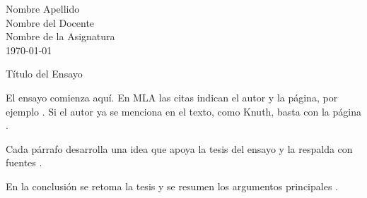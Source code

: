 \documentclass[12pt,a4paper]{article}
\begin{document}
\noindent Nombre Apellido\\
Nombre del Docente\\
Nombre de la Asignatura\\
\today

\begin{center}
  Título del Ensayo
\end{center}

El ensayo comienza aquí. En MLA las citas indican el autor y la página, por ejemplo
\autocite[12]{lamport1994}. Si el autor ya se menciona en el texto, como Knuth, basta
con la página \autocite[45]{knuth1984}.

Cada párrafo desarrolla una idea que apoya la tesis del ensayo y la respalda con
fuentes \autocite[3]{mla2021}.

En la conclusión se retoma la tesis y se resumen los argumentos principales
\autocite[102]{goossens2004}.

\newpage
\printbibliography[title=Obras citadas]
\end{document}
